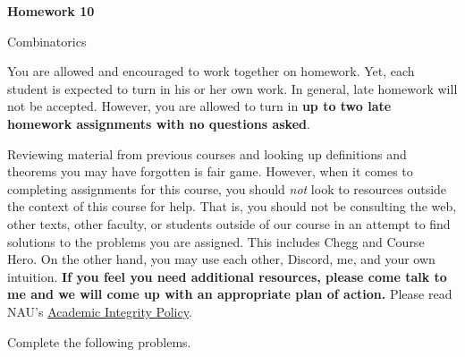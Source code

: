 \documentclass[11pt]{article}%
\theoremstyle{definition}
\newcommand{\blankline}{\pagebreak[2]\vspace{.5\baselineskip}}
\begin{document}
\begin{center}
{\Large\bf Homework 10}

\smallskip

Combinatorics
\end{center}

\thispagestyle{fancy}

You are allowed and encouraged to work together on homework. Yet, each student is expected to turn in his or her own work. In general, late homework will not be accepted. However, you are allowed to turn in \textbf{up to two late homework assignments with no questions asked}. 

\blankline

Reviewing material from previous courses and looking up definitions and theorems you may have forgotten is fair game. However, when it comes to completing assignments for this course, you should \emph{not} look to resources outside the context of this course for help.  That is, you should not be consulting the web, other texts, other faculty, or students outside of our course in an attempt to find solutions to the problems you are assigned.  This includes Chegg and Course Hero. On the other hand, you may use each other, Discord, me, and your own intuition. \textbf{If you feel you need additional resources, please come talk to me and we will come up with an appropriate plan of action.} Please read NAU's \href{https://www5.nau.edu/policies/Client/Details/828?whoIsLooking=Students&pertainsTo=All&sortDirection=Ascending&page=1}{Academic Integrity Policy}.

\blankline

Complete the following problems. 
\end{document}
